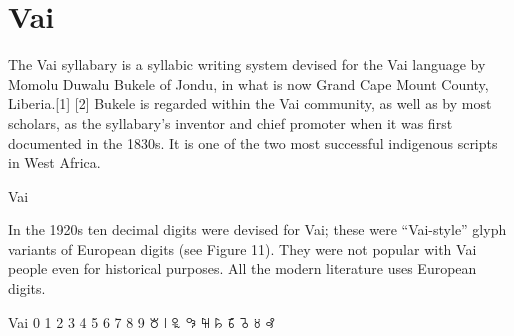 \section{Vai}
\label{s:vai}

The Vai syllabary is a syllabic writing system devised for the Vai language by Momolu Duwalu Bukele of Jondu, in what is now Grand Cape Mount County, Liberia.[1] [2] Bukele is regarded within the Vai community, as well as by most scholars, as the syllabary's inventor and chief promoter when it was first documented in the 1830s. It is one of the two most successful indigenous scripts in West Africa.

\newfontfamily{}
\begin{scriptexample}[]{Vai}
\end{scriptexample}

In the 1920s ten decimal digits were devised for Vai; these were “Vai-style” glyph variants of
European digits (see Figure 11). They were not popular with Vai people  even for historical purposes. All
the modern literature uses European digits.


\begin{scriptexample}[]{Vai}
\bgroup
\vai
\obeylines\Large
0	1	2	3	4	5	6	7	8	9
꘠	꘡	꘢	꘣	꘤	꘥	꘦	꘧	꘨	꘩
\vai
\egroup
\end{scriptexample}



